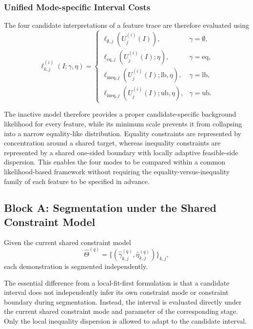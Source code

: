 \documentclass[lettersize,journal]{IEEEtran}
\begin{document}

\subsubsection{Unified Mode-specific Interval Costs}

The four candidate interpretations of a feature trace are therefore evaluated using
\[
\ell_{k,j}^{(i)}
\left(
I;\gamma,\eta
\right)
=
\begin{cases}
\ell_{\emptyset,j}
\left(
U_j^{(i)}(I)
\right),
&
\gamma=\emptyset,
\\[2mm]
\ell_{\mathrm{eq},j}
\left(
U_j^{(i)}(I);
\eta
\right),
&
\gamma=\mathrm{eq},
\\[2mm]
\ell_{\mathrm{ineq},j}
\left(
U_j^{(i)}(I);
\mathrm{lb},\eta
\right),
&
\gamma=\mathrm{lb},
\\[2mm]
\ell_{\mathrm{ineq},j}
\left(
U_j^{(i)}(I);
\mathrm{ub},\eta
\right),
&
\gamma=\mathrm{ub}.
\end{cases}
\]

The inactive model therefore provides a proper candidate-specific background likelihood for every feature, while its minimum scale prevents it from collapsing into a narrow equality-like distribution. Equality constraints are represented by concentration around a shared target, whereas inequality constraints are represented by a shared one-sided boundary with locally adaptive feasible-side dispersion. This enables the four modes to be compared within a common likelihood-based framework without requiring the equality-versus-inequality family of each feature to be specified in advance.
\subsection{Block A: Segmentation under the Shared Constraint Model}

Given the current shared constraint model
\[
\widehat{\Theta}^{(q)}
=
\{
(\widehat{\gamma}_{k,j}^{(q)},
\widehat{\eta}_{k,j}^{(q)})
\}_{k,j},
\]
each demonstration is segmented independently.

The essential difference from a local-fit-first formulation is that a candidate interval does not independently infer its own constraint mode or constraint boundary during segmentation. Instead, the interval is evaluated directly under the current shared constraint mode and parameter of the corresponding stage. Only the local inequality dispersion is allowed to adapt to the candidate interval.
\end{document}

